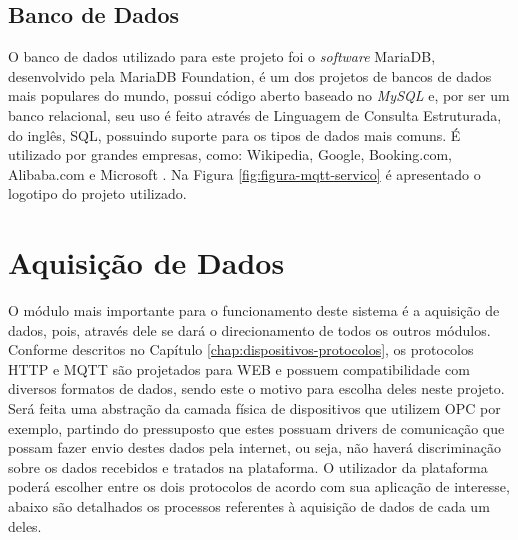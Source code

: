        \subsection{Banco de Dados}
        \label{sec:banco-dados}
        O banco de dados utilizado para este projeto foi o \textit{software} MariaDB, desenvolvido pela MariaDB Foundation, é um dos projetos de bancos de dados mais populares do mundo, possui código aberto baseado no \textit{MySQL} e, por ser um banco relacional, seu uso é feito através de Linguagem de Consulta Estruturada, do inglês, \gls{SQL}, possuindo suporte para os tipos de dados mais comuns. É utilizado por grandes empresas, como: Wikipedia, Google, Booking.com, Alibaba.com e Microsoft \cite{MariaDB}. Na Figura \ref{fig:figura-mqtt-servico} é apresentado o logotipo do projeto utilizado.
        
        \begin{figure}[!h]
    	\end{figure}
    	
\section{Aquisição de Dados}
\label{sec:aquisicao-dados}
O módulo mais importante para o funcionamento deste sistema é a aquisição de dados, pois, através dele se dará o direcionamento de todos os outros módulos. Conforme descritos no Capítulo \ref{chap:dispositivos-protocolos}, os protocolos \gls{HTTP} e \gls{MQTT} são  projetados para \gls{WEB} e possuem compatibilidade com diversos formatos de dados, sendo este o motivo para escolha deles neste projeto. Será feita uma abstração da camada física de dispositivos que utilizem \gls{OPC} por exemplo, partindo do pressuposto que estes possuam drivers de comunicação que possam fazer envio destes dados pela internet, ou seja, não haverá discriminação sobre os dados recebidos e tratados na plataforma. O utilizador da plataforma poderá escolher entre os dois protocolos de acordo com sua aplicação de interesse, abaixo são detalhados os processos referentes à aquisição de dados de cada um deles.

